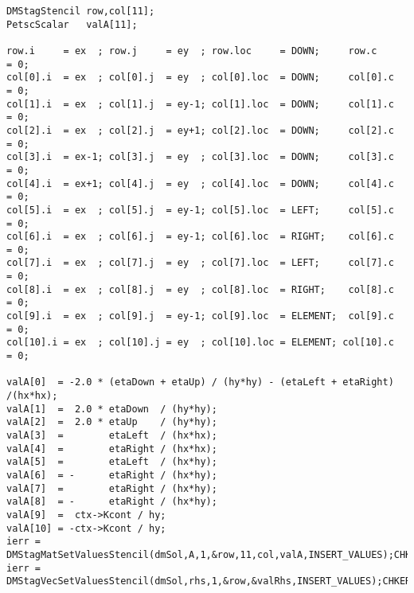 \begin{verbatim}
DMStagStencil row,col[11];
PetscScalar   valA[11];

row.i     = ex  ; row.j     = ey  ; row.loc     = DOWN;     row.c     = 0;
col[0].i  = ex  ; col[0].j  = ey  ; col[0].loc  = DOWN;     col[0].c  = 0;
col[1].i  = ex  ; col[1].j  = ey-1; col[1].loc  = DOWN;     col[1].c  = 0;
col[2].i  = ex  ; col[2].j  = ey+1; col[2].loc  = DOWN;     col[2].c  = 0;
col[3].i  = ex-1; col[3].j  = ey  ; col[3].loc  = DOWN;     col[3].c  = 0;
col[4].i  = ex+1; col[4].j  = ey  ; col[4].loc  = DOWN;     col[4].c  = 0;
col[5].i  = ex  ; col[5].j  = ey-1; col[5].loc  = LEFT;     col[5].c  = 0;
col[6].i  = ex  ; col[6].j  = ey-1; col[6].loc  = RIGHT;    col[6].c  = 0;
col[7].i  = ex  ; col[7].j  = ey  ; col[7].loc  = LEFT;     col[7].c  = 0;
col[8].i  = ex  ; col[8].j  = ey  ; col[8].loc  = RIGHT;    col[8].c  = 0;
col[9].i  = ex  ; col[9].j  = ey-1; col[9].loc  = ELEMENT;  col[9].c  = 0;
col[10].i = ex  ; col[10].j = ey  ; col[10].loc = ELEMENT; col[10].c  = 0;

valA[0]  = -2.0 * (etaDown + etaUp) / (hy*hy) - (etaLeft + etaRight) /(hx*hx);
valA[1]  =  2.0 * etaDown  / (hy*hy);
valA[2]  =  2.0 * etaUp    / (hy*hy);
valA[3]  =        etaLeft  / (hx*hx);
valA[4]  =        etaRight / (hx*hx);
valA[5]  =        etaLeft  / (hx*hy);
valA[6]  = -      etaRight / (hx*hy);
valA[7]  =        etaRight / (hx*hy);
valA[8]  = -      etaRight / (hx*hy);
valA[9]  =  ctx->Kcont / hy;
valA[10] = -ctx->Kcont / hy;
ierr = DMStagMatSetValuesStencil(dmSol,A,1,&row,11,col,valA,INSERT_VALUES);CHKERRQ(ierr);
ierr = DMStagVecSetValuesStencil(dmSol,rhs,1,&row,&valRhs,INSERT_VALUES);CHKERRQ(ierr);
\end{verbatim}
